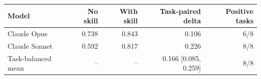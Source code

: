 \begin{tabular}{lrrrr}
\toprule
Model & No skill & With skill & Task-paired delta & Positive tasks \\
\midrule
Claude Opus & 0.738 & 0.843 & 0.106 & 6/8 \\
Claude Sonnet & 0.592 & 0.817 & 0.226 & 8/8 \\
Task-balanced mean & -- & -- & 0.166 [0.085, 0.259] & 8/8 \\
\bottomrule
\end{tabular}
